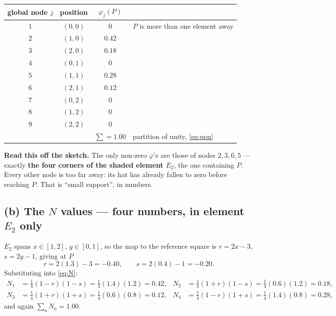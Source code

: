 \documentclass[11pt]{article}
\begin{document}
\begin{center}\small
\renewcommand{\arraystretch}{1.25}
\begin{tabular}{@{}cccl@{}}
\toprule
global node $j$ & position & $\varphi_{j}(P)$ & \\
\midrule
$1$ & $(0,0)$ & $0$ & \color{black!50}$P$ is more than one element away\\
$2$ & $(1,0)$ & $\bm{0.42}$ & \\
$3$ & $(2,0)$ & $\bm{0.18}$ & \\
$4$ & $(0,1)$ & $0$ & \color{black!50}\\
$5$ & $(1,1)$ & $\bm{0.28}$ & \\
$6$ & $(2,1)$ & $\bm{0.12}$ & \\
$7$ & $(0,2)$ & $0$ & \color{black!50}\\
$8$ & $(1,2)$ & $0$ & \color{black!50}\\
$9$ & $(2,2)$ & $0$ & \color{black!50}\\
\midrule
 & & $\sum=1.00$ & \color{black!50}partition of unity, \eqref{eq:pou}\\
\bottomrule
\end{tabular}
\label{tab:phivals}
\end{center}

\textbf{Read this off the sketch.} The only non-zero $\varphi$'s are those of
nodes $2,3,6,5$ --- exactly \textbf{the four corners of the shaded element
$E_{2}$}, the one containing $P$. Every other node is too far away: its hat has
already fallen to zero before reaching $P$. That is ``small support'', in
numbers.

\subsection*{(b) The $N$ values --- four numbers, in element $E_{2}$ only}

$E_{2}$ spans $x\in[1,2]$, $y\in[0,1]$, so the map to the reference square is
$r=2x-3$, $s=2y-1$, giving at $P$
\[
  r=2(1.3)-3=-0.40,\qquad s=2(0.4)-1=-0.20 .
\]
Substituting into \eqref{eq:N}:
\begin{align*}
  N_{1}&=\tfrac14(1-r)(1-s)=\tfrac14(1.4)(1.2)=\bm{0.42},&
  N_{2}&=\tfrac14(1+r)(1-s)=\tfrac14(0.6)(1.2)=\bm{0.18},\\
  N_{3}&=\tfrac14(1+r)(1+s)=\tfrac14(0.6)(0.8)=\bm{0.12},&
  N_{4}&=\tfrac14(1-r)(1+s)=\tfrac14(1.4)(0.8)=\bm{0.28},
\end{align*}
and again $\sum_{a}N_{a}=1.00$.
\end{document}
